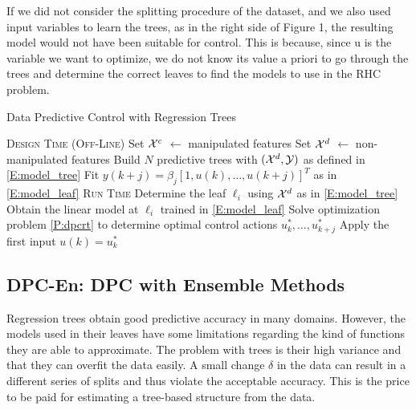 \textcolor[rgb]{0,0,1}{\begin{remark}
	 If we did not consider the splitting procedure	of the dataset, and we also used input variables to learn the trees, as in the right side of Figure 1, the resulting
	 model would not have been suitable for control. This is because, since u is the variable we want to optimize, we do not know its value a priori to go through the trees and determine the correct leaves to find the models to use in the RHC problem.
\end{remark}}

\begin{algorithm}[t!]
	\caption{Data Predictive Control with Regression Trees}
	\label{A:dpcrt}
	\begin{algorithmic}[1]
		\State \textsc{Design Time (Off-Line)}
		\State Set $\mathcal{X}^c$ $\gets$ manipulated features
		\State Set $\mathcal{X}^d$ $\gets$ non-manipulated features
		\State Build $N$ predictive trees with $(\mathcal{X}^d,\mathcal{Y})$ as defined in \eqref{E:model_tree}
		\State Fit $ y(k+j) =  \beta_j \left[1,u(k),\ldots,u(k+j) \right]^T$ as in \eqref{E:model_leaf}
		\EndFor
		\EndFor
		\EndProcedure
		\State \textsc{Run Time}
		\State Determine the leaf $\ell_i$ using $\mathcal{X}^d$ as in \eqref{E:model_tree}
		\State Obtain the linear model at $\ell_i$ trained in \eqref{E:model_leaf}
		\EndFor
		\State Solve optimization problem \ref{P:dpcrt} to determine optimal
		\State control actions $u^*_k,\ldots,u^*_{k+j}$
		\State Apply the first input $u(k)=u^*_k$
		\EndWhile
		\EndProcedure
	\end{algorithmic}
\end{algorithm}

\subsection{DPC-En: DPC with Ensemble Methods}
\label{SS:dpcrf}
Regression trees obtain good predictive accuracy in many domains. However, the models used in their leaves have some limitations regarding the kind of functions they are able to approximate.
The problem with trees is their high variance and that they can overfit the data easily.
A small change $\delta$ in the data can result in a different series of splits and thus violate the acceptable accuracy.
This is the price to be paid for estimating a tree-based structure from the data.


